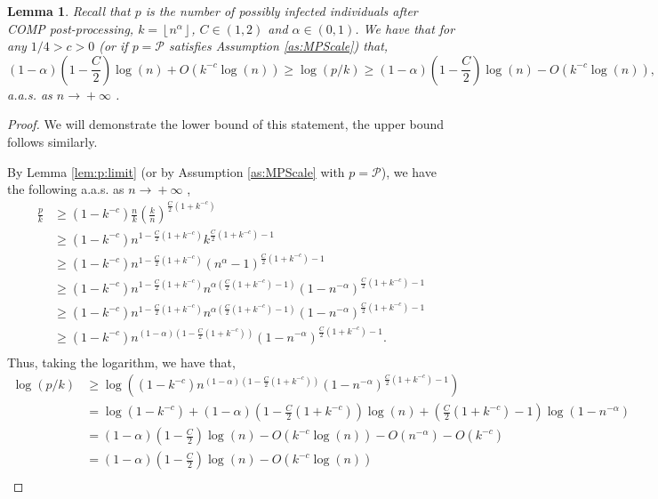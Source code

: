 \documentclass[12pt,reqno]{amsart}
\numberwithin{equation}{section}
\newtheorem{lemma}[theorem]{Lemma}
\theoremstyle{definition}
\newcommand{\floor}[1]{\left\lfloor #1 \right\rfloor}
\newcommand{\conv}[1]{\overset{#1}{\rightarrow}}
\renewcommand{\[}{\begin{equation}}
\renewcommand{\]}{\end{equation}}
\renewcommand{\|}{\bigg{|}}
\newcommand{\ngrow}{\ensuremath{n \conv{} +\infty} }
\newcommand{\pSet}{\mathcal{P}}
\newcommand{\err}{c}
\begin{document}
\begin{lemma}\label{lem:plower}
    Recall that $p$ is the number of possibly infected individuals after COMP post-processing, $k = \floor{n^\alpha}$, $C \in (1,2)$ and $\alpha \in (0,1)$. We have that for any $1/4 > c > 0$ (or if $p = \pSet$ satisfies Assumption \ref{as:MPScale}) that,
    \[(1-\alpha)\left(1-\frac{C}{2}\right)\log(n) + O(k^{-c}\log(n)) \geq \log(p/k) \geq (1-\alpha)\left(1-\frac{C}{2}\right)\log(n) - O(k^{-c}\log(n)),\]
    a.a.s. as \ngrow\!.
\end{lemma}

\begin{proof}
We will demonstrate the lower bound of this statement, the upper bound follows similarly.

By Lemma \ref{lem:p:limit} (or by Assumption \ref{as:MPScale} with $p = \pSet$), we have the following a.a.s. as \ngrow\!,
\begin{align}
\frac{p}{k} &\geq (1-k^{-\err})\frac{n}{k}\left(\frac{k}{n}\right)^{\frac{C}{2}(1+k^{-\err})}\\
&\geq (1-k^{-\err})n^{1-\frac{C}{2}(1 + k^{-\err})}k^{\frac{C}{2}(1 + k^{-\err}) - 1}\\
&\geq (1-k^{-\err})n^{1-\frac{C}{2}(1 + k^{-\err})}(n^\alpha - 1)^{\frac{C}{2}(1 + k^{-\err}) - 1}\\
&\geq (1-k^{-\err})n^{1-\frac{C}{2}(1 + k^{-\err})}{n}^{\alpha(\frac{C}{2}(1 + k^{-\err}) - 1)}(1-n^{-\alpha})^{\frac{C}{2}(1 + k^{-\err}) - 1}\\
&\geq (1-k^{-\err})n^{1-\frac{C}{2}(1 + k^{-\err})}{n}^{\alpha(\frac{C}{2}(1 + k^{-\err}) - 1)}(1-n^{-\alpha})^{\frac{C}{2}(1 + k^{-\err}) - 1}\\
&\geq (1-k^{-\err})n^{(1-\alpha)(1-\frac{C}{2}(1 + k^{-\err}))}(1-n^{-\alpha})^{\frac{C}{2}(1 + k^{-\err}) - 1}.\\
\end{align}
Thus, taking the logarithm, we have that,
\begin{align}
    \log(p/k) &\geq \log\left((1-k^{-\err})n^{(1-\alpha)(1-\frac{C}{2}(1 + k^{-\err}))}(1-n^{-\alpha})^{\frac{C}{2}(1 + k^{-\err}) - 1}\right)\\
    &= \log(1-k^{-\err}) + (1-\alpha)\left(1-\frac{C}{2}(1 + k^{-\err})\right)\log(n) + \left(\frac{C}{2}(1 + k^{-\err}) - 1\right)\log(1-n^{-\alpha})\\
    &= (1-\alpha)\left(1-\frac{C}{2}\right)\log(n) - O(k^{-\err}\log(n)) - O(n^{-\alpha}) - O(k^{-\err})\\
    &= (1-\alpha)\left(1-\frac{C}{2}\right)\log(n) - O(k^{-\err}\log(n))\\
\end{align}
\end{proof}
\end{document}
